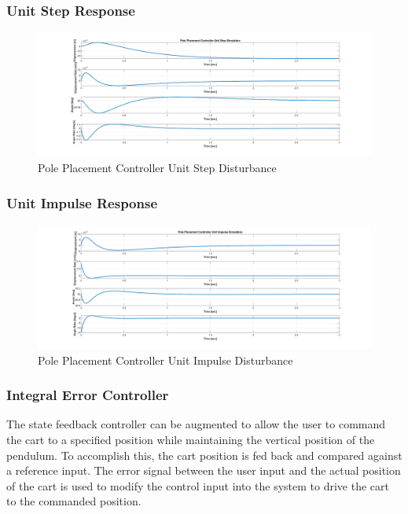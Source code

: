 \documentclass[titlepage]{article}
\begin{document}
\subsubsection{Unit Step Response}
\begin{figure}[H]
\center
\includegraphics[width=1\linewidth]{pole_placement_unit_step.png}
\caption{Pole Placement Controller Unit Step Disturbance}
\end{figure}

\subsubsection{Unit Impulse Response}
\begin{figure}[H]
\center
\includegraphics[width=1\linewidth]{pole_placement_unit_impulse.png}
\caption{Pole Placement Controller Unit Impulse Disturbance}
\end{figure}

\subsubsection{Integral Error Controller}

The state feedback controller can be augmented to allow the user to command the cart to a specified position while maintaining the vertical position of the pendulum. To accomplish this, the cart position is fed back and compared against a reference input. The error signal between the user input and the actual position of the cart is used to modify the control input into the system to drive the cart to the commanded position.\par
\end{document}
